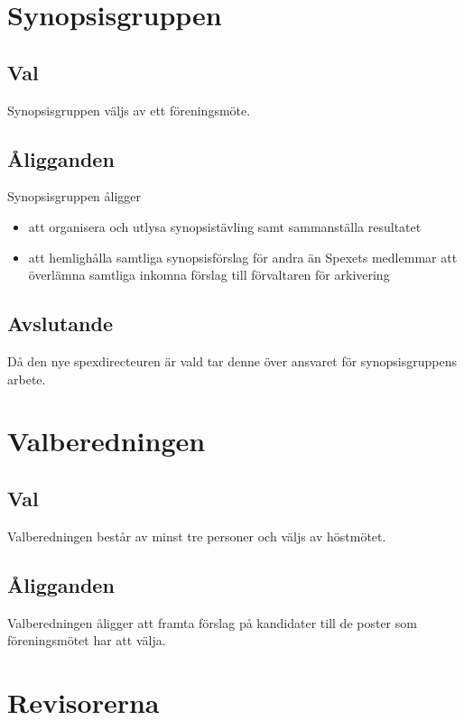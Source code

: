 \documentclass[a4paper]{article}
\begin{document}
\section{Synopsisgruppen}
\label{section:synopsisgruppen}

\subsection{Val}
Synopsisgruppen väljs av ett föreningsmöte.

\subsection{Åligganden}
Synopsisgruppen åligger

\begin{itemize}
  \item att organisera och utlysa synopsistävling samt sammanställa resultatet
  \item att hemlighålla samtliga synopsisförslag för andra än Spexets medlemmar att överlämna samtliga inkomna förslag till förvaltaren för arkivering
\end{itemize}

\subsection{Avslutande}
Då den nye spexdirecteuren är vald tar denne över ansvaret för synopsisgruppens arbete.

\section{Valberedningen}
\label{section:valberedningen}

\subsection{Val}
Valberedningen består av minst tre personer och väljs av höstmötet.

\subsection{Åligganden}
Valberedningen åligger att framta förslag på kandidater till de poster som föreningsmötet har att välja.

\section{Revisorerna}
\label{section:revisorerna}
\end{document}
